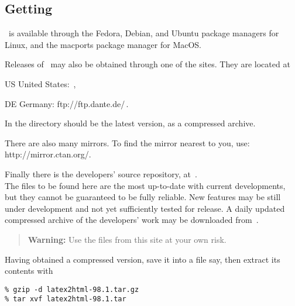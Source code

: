 \subsection[center]{Getting \protect\latextohtml}
\tableofchildlinks*
\htmlrule
\latextohtml\ is available through the Fedora, Debian, and Ubuntu
package managers for Linux, and the macports package manager for MacOS.

%
%
%
Releases of \latextohtml\ may also be obtained through one of the 
%
{\CTANtug{}} sites.
They are located at
\begin{htmllist}
\item [US ]
United States:
\,,
\item [DE ]
Germany:
%
{ftp://ftp.dante.de/}\,.
\end{htmllist}
In the directory \htmladdnormallink{\CTANA/}{\CTANtug{\CTANA}} 
should be the latest version, as a compressed archive.

\smallskip\noindent
There are also many mirrors.
To find the mirror nearest to you, use:
%
{http://mirror.ctan.org/\CTANA}.


\bigskip
{}\label{cvsrepos}%
\noindent
Finally there is the \latextohtml{} developers' source repository, at \CVSrepos\,.\\
The files to be found here are the most up-to-date with current developments,
but they cannot be guaranteed to be fully reliable. New features may be
still under development and not yet sufficiently tested for release.
A daily updated compressed archive of the developers' work may be
downloaded from \CVSlatest\,.

\begin{quote}
\textbf{Warning: }Use the files from this site at your own risk.
\end{quote}%

\htmlrule{}%
\medskip\noindent
Having obtained a compressed  version, save it into a file 
 say,
then extract its contents with 
\begin{small}
\begin{verbatim}
% gzip -d latex2html-98.1.tar.gz
% tar xvf latex2html-98.1.tar
\end{verbatim} 
\end{small}
%

